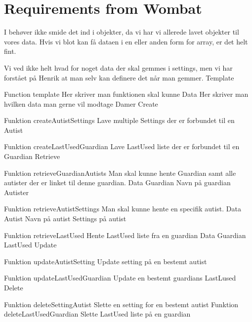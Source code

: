 \section{Requirements from Wombat}
\label{sec:timerreq}
I beh\o{}ver ikke smide det ind i objekter, da vi har vi allerede lavet objekter til vores data. 
Hvis vi blot kan f\aa{} dataen i en eller anden form for array, er det helt fint.

Vi ved ikke helt hvad for noget data der skal gemmes i settings, men vi har forst\aa{}et p\aa{} Henrik at man selv kan definere det n\aa{}r man gemmer.
Template

Function template
Her skriver man funktionen skal kunne
Data
Her skriver man hvilken data man gerne vil modtage
Damer
Create

Funktion createAutistSettings
Lave multiple Settings der er forbundet til en Autist

Funktion createLastUsedGuardian
Lave LastUsed liste der er forbundet til en Guardian
Retrieve

Funktion retrieveGuardianAutists
Man skal kunne hente Guardian samt alle autister der er linket til denne guardian.
Data
Guardian
Navn p\aa{} guardian
Autister

Funktion retrieveAutistSettings
Man skal kunne hente en specifik autist.
Data
Autist
Navn p\aa{} autist
Settings p\aa{} autist

Funktion retrieveLastUsed
Hente LastUsed liste fra en guardian
Data
Guardian
LastUsed
Update

Funktion updateAutistSetting
Update setting p\aa{} en bestemt autist

Funktion updateLastUsedGuardian
Update en bestemt guardians LastLused 
Delete

Funktion deleteSettingAutist
Slette en setting for en bestemt autist
Funktion deleteLastUsedGuardian
Slette LastUsed liste p\aa{} en guardian